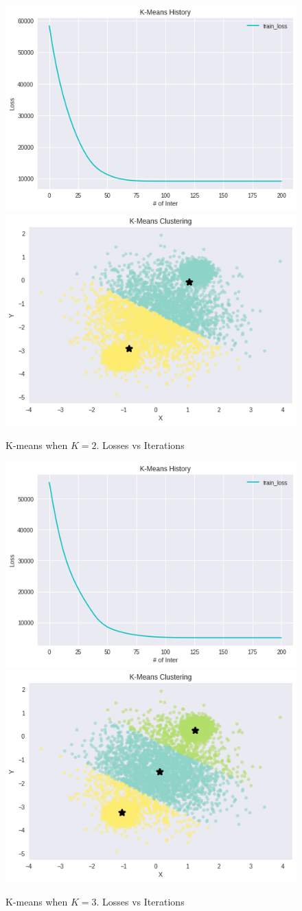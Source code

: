 \documentclass[10pt,letterpaper]{article}
\begin{document}
\begin{figure}[H]
\centering

  \includegraphics[width=.42\linewidth]{imgs/1_2_k2l.png}
  \includegraphics[width=.42\linewidth]{imgs/1_2_k2p.png}
  \caption{K-means when $K=2$. Losses vs Iterations}
  

\end{figure}

\begin{figure}[H]
\centering

  \includegraphics[width=.42\linewidth]{imgs/1_2_k3l.png}
  \includegraphics[width=.42\linewidth]{imgs/1_2_k3p.png}
  \caption{K-means when $K=3$. Losses vs Iterations}
  

\end{figure}
\end{document}
